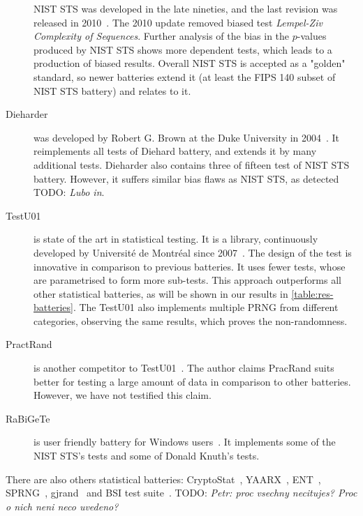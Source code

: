 \documentclass[
  print, %
  Table,   %
  nolof,     %
  nolot,     %
  11pt, %
  oneside  %
]{fithesis3}
\newcommand{\todo}[1]{TODO: \textit{#1}}
\begin{document}
\begin{description}
    NIST STS was developed in the late nineties, and the last revision was released in 2010~\cite{rukhin2001statistical}. The 2010 update removed biased test \textit{Lempel-Ziv Complexity of Sequences}. Further analysis of the bias in the $p$-values produced by NIST STS shows more dependent tests, which leads to a production of biased results. Overall NIST STS is accepted as a "golden" standard, so newer batteries extend it (at least the FIPS 140 subset of NIST STS battery) and relates to it. %
    \item[Dieharder] was developed by Robert G. Brown at the Duke University in 2004~\cite{brown2013dieharder}. It reimplements all tests of Diehard battery, and extends it by many additional tests. Dieharder also contains three of fifteen test of NIST STS battery. However, it suffers similar bias flaws as NIST STS, as detected \todo{Lubo in}. %
    \item[TestU01] is state of the art in statistical testing. It is a library, continuously developed by Université de Montréal since 2007~\cite{l2007testu01}. The design of the test is innovative in comparison to previous batteries. It uses fewer tests, whose are parametrised to form more sub-tests. This approach outperforms all other statistical batteries, as will be shown in our results in \cref{table:res-batteries}. The TestU01 also implements multiple PRNG from different categories, observing the same results, which proves the non-randomness. %
    \item[PractRand] is another competitor to TestU01~\cite{dotypractically}. The author claims PracRand suits better for testing a large amount of data in comparison to other batteries. However, we have not testified this claim.
    \item[RaBiGeTe] is user friendly battery for Windows users~\cite{rabigete}. It implements some of the NIST STS's tests and some of Donald Knuth's tests.
\end{description}

There are also others statistical batteries: CryptoStat~\cite{kaminsky2013cryptostat}, YAARX~\cite{biryukov2014automatic}, ENT~\cite{walker2008ent}, SPRNG~\cite{mascagni2000algorithm}, gjrand~\cite{gjrand} and BSI test suite~\cite{schindler2002evaluation}. \todo{Petr: proc vsechny necitujes? Proc o nich neni neco uvedeno? }

\end{document}
